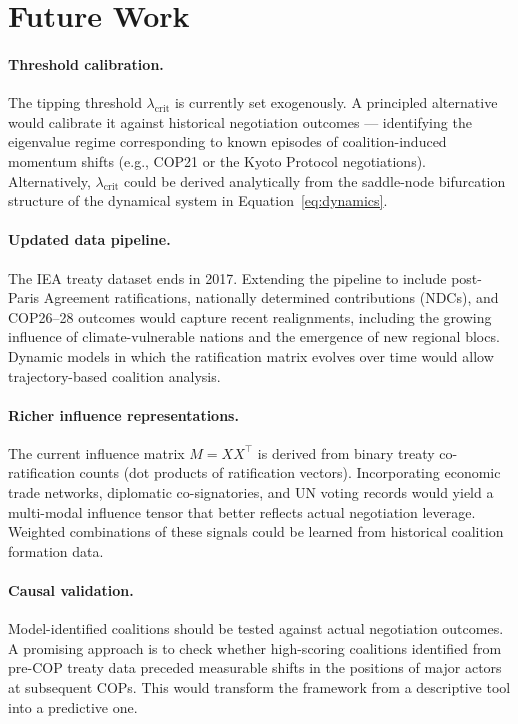 \documentclass[11pt]{article}
\begin{document}
\section{Future Work}
\label{sec:future}

\paragraph{Threshold calibration.}
The tipping threshold $\lambda_{\text{crit}}$ is currently set exogenously. A principled alternative would calibrate it against historical negotiation outcomes --- identifying the eigenvalue regime corresponding to known episodes of coalition-induced momentum shifts (e.g., COP21 or the Kyoto Protocol negotiations). Alternatively, $\lambda_{\text{crit}}$ could be derived analytically from the saddle-node bifurcation structure of the dynamical system in Equation~\eqref{eq:dynamics}.

\paragraph{Updated data pipeline.}
The IEA treaty dataset ends in 2017. Extending the pipeline to include post-Paris Agreement ratifications, nationally determined contributions (NDCs), and COP26--28 outcomes would capture recent realignments, including the growing influence of climate-vulnerable nations and the emergence of new regional blocs. Dynamic models in which the ratification matrix evolves over time would allow trajectory-based coalition analysis.

\paragraph{Richer influence representations.}
The current influence matrix $M = XX^\top$ is derived from binary treaty co-ratification counts (dot products of ratification vectors). Incorporating economic trade networks, diplomatic co-signatories, and UN voting records would yield a multi-modal influence tensor that better reflects actual negotiation leverage. Weighted combinations of these signals could be learned from historical coalition formation data.

\paragraph{Causal validation.}
Model-identified coalitions should be tested against actual negotiation outcomes. A promising approach is to check whether high-scoring coalitions identified from pre-COP treaty data preceded measurable shifts in the positions of major actors at subsequent COPs. This would transform the framework from a descriptive tool into a predictive one.
\end{document}
